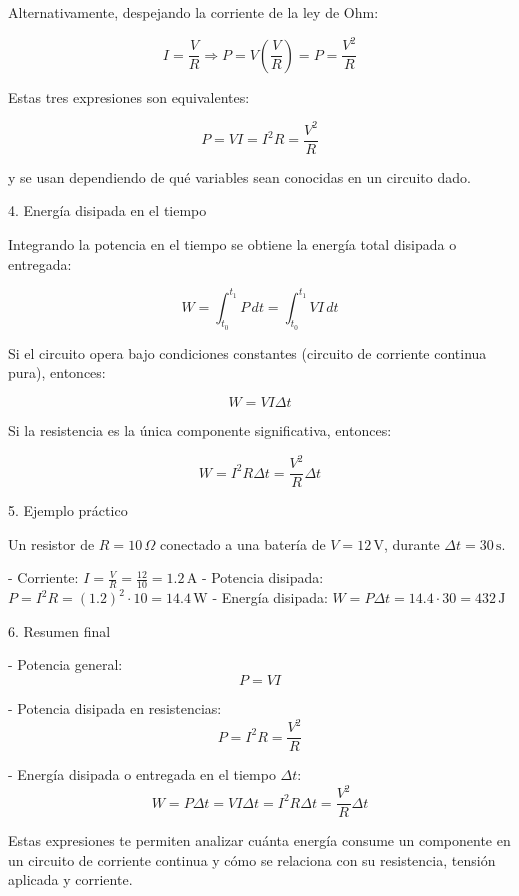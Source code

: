 Alternativamente, despejando la corriente de la ley de Ohm:

\[
I = \frac{V}{R} \Rightarrow P = V \left( \frac{V}{R} \right) = \boxed{P = \frac{V^2}{R}}
\]

Estas tres expresiones son equivalentes:

\[
\boxed{P = VI = I^2 R = \frac{V^2}{R}}
\]

y se usan dependiendo de qué variables sean conocidas en un circuito dado.


4. Energía disipada en el tiempo

Integrando la potencia en el tiempo se obtiene la energía total disipada o entregada:

\[
W = \int_{t_0}^{t_1} P \, dt = \int_{t_0}^{t_1} VI \, dt
\]

Si el circuito opera bajo condiciones constantes (circuito de corriente continua pura), entonces:

\[
W = V I \Delta t
\]

Si la resistencia es la única componente significativa, entonces:

\[
W = I^2 R \Delta t = \frac{V^2}{R} \Delta t
\]


5. Ejemplo práctico

Un resistor de \( R = 10 \, \Omega \) conectado a una batería de \( V = 12 \, \text{V} \), durante \( \Delta t = 30 \, \text{s} \).

- Corriente: \( I = \frac{V}{R} = \frac{12}{10} = 1.2 \, \text{A} \)
- Potencia disipada: \( P = I^2 R = (1.2)^2 \cdot 10 = 14.4 \, \text{W} \)
- Energía disipada: \( W = P \Delta t = 14.4 \cdot 30 = 432 \, \text{J} \)


6. Resumen final

- Potencia general:  
\[
\boxed{P = V I}
\]

- Potencia disipada en resistencias:  
\[
\boxed{P = I^2 R = \frac{V^2}{R}}
\]

- Energía disipada o entregada en el tiempo \( \Delta t \):  
\[
\boxed{W = P \Delta t = V I \Delta t = I^2 R \Delta t = \frac{V^2}{R} \Delta t}
\]

Estas expresiones te permiten analizar cuánta energía consume un componente en un circuito de corriente continua y cómo se relaciona con su resistencia, tensión aplicada y corriente.